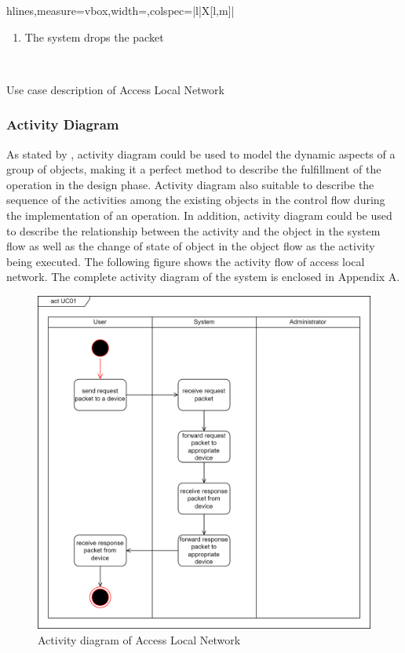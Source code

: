 \documentclass[../index.tex]{subfiles}
\begin{document}
\begin{table}[H]
\begin{tblr}{hlines,measure=vbox,width=\textwidth,colspec={|l|X[l,m]|}}
\begin{enumerate}
\begin{enumerate}
            \item The system drops the packet
          \end{enumerate}
    \end{enumerate} \\
  \end{tblr}
  \caption{Use case description of Access Local Network}
  \label{table:use_case_1}
\end{table}

\subsubsection{Activity Diagram}

As stated by \cite{10.1109/APSEC.2004.55}, activity diagram could be used to model the dynamic
aspects of a group of objects, making it a perfect method to describe the fulfillment of the
operation in the design phase. Activity diagram also suitable to describe the sequence of the
activities among the existing objects in the control flow during the implementation of an operation.
In addition, activity diagram could be used to describe the relationship between the activity and
the object in the system flow as well as the change of state of object in the object flow as the
activity being executed. The following figure shows the activity flow of access local network. The
complete activity diagram of the system is enclosed in Appendix A.

\begin{figure}[h]
  \includegraphics[width=\textwidth]{../assets/activity_diagram.drawio.png}
  \caption{Activity diagram of Access Local Network}
  \label{fig:activity_diagram_1}
\end{figure}
\end{document}
